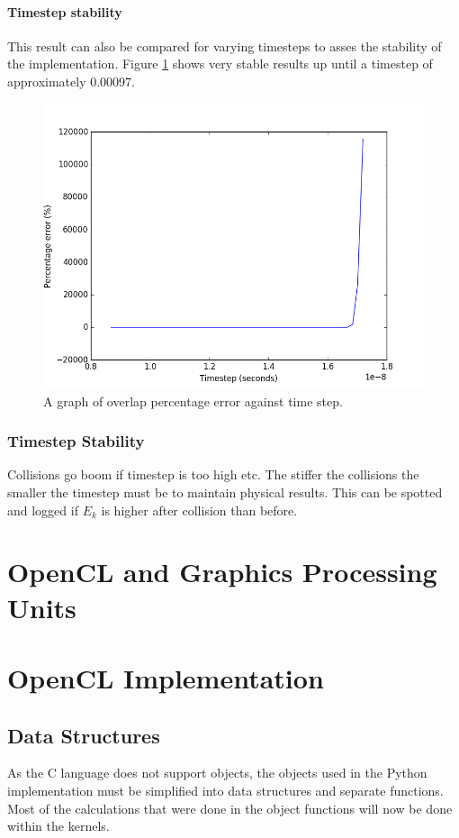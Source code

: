 \documentclass[10pt,a4paper,titlepage]{report}
\begin{document}
\subsubsection{Timestep stability}
This result can also be compared for varying timesteps to asses the stability of the implementation. Figure \ref{fig:overlap_percentage_error_against_timestep} shows very stable results up until a timestep of approximately 0.00097.
\begin{figure}[!htb]
\centering
\includegraphics[scale=0.75]{figures/ParticleBounceTimestepAgainstPercentageError.png}
\caption{A graph of overlap percentage error against time step.}
\label{fig:overlap_percentage_error_against_timestep}
\end{figure}
\subsection{Timestep Stability}
Collisions go boom if timestep is too high etc. %
The stiffer the collisions the smaller the timestep must be to maintain physical results.
This can be spotted and logged if $E_{k}$ is higher after collision than before.
\chapter{OpenCL and Graphics Processing Units}
\chapter{OpenCL Implementation}
\section{Data Structures}
As the C language does not support objects, the objects used in the Python implementation must be simplified into data structures and separate functions. Most of the calculations that were done in the object functions will now be done within the kernels.
\end{document}
